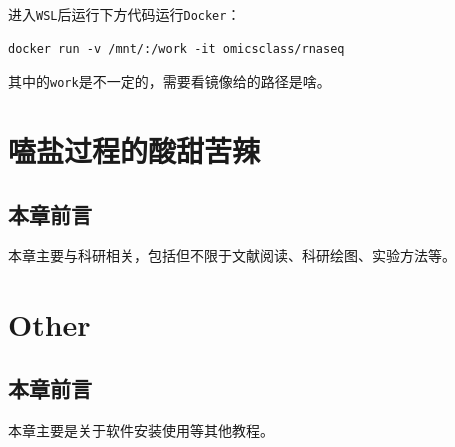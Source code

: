 \documentclass[
]{book}
\begin{document}
进入\texttt{WSL}后运行下方代码运行\texttt{Docker}：

\begin{verbatim}
docker run -v /mnt/:/work -it omicsclass/rnaseq
\end{verbatim}

其中的\texttt{work}是不一定的，需要看镜像给的路径是啥。

\hypertarget{research}{%
\chapter{嗑盐过程的酸甜苦辣}\label{research}}

\hypertarget{ux672cux7ae0ux524dux8a00-3}{%
\section{本章前言}\label{ux672cux7ae0ux524dux8a00-3}}

本章主要与科研相关，包括但不限于文献阅读、科研绘图、实验方法等。

\hypertarget{other}{%
\chapter{Other}\label{other}}

\hypertarget{ux672cux7ae0ux524dux8a00-4}{%
\section{本章前言}\label{ux672cux7ae0ux524dux8a00-4}}

本章主要是关于软件安装使用等其他教程。

\printbibliography
\end{document}

